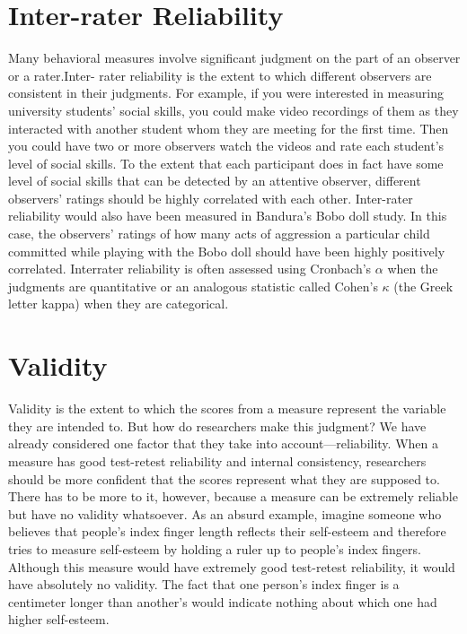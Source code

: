 \documentclass[]{book}
\theoremstyle{definition}
\theoremstyle{definition}
\theoremstyle{remark}
\begin{document}
\section{Inter-rater Reliability}\label{inter-rater-reliability}

Many behavioral measures involve significant judgment on the part of an
observer or a rater.Inter- rater reliability is the extent to which
different observers are consistent in their judgments. For example, if
you were interested in measuring university students' social skills, you
could make video recordings of them as they interacted with another
student whom they are meeting for the first time. Then you could have
two or more observers watch the videos and rate each student's level of
social skills. To the extent that each participant does in fact have
some level of social skills that can be detected by an attentive
observer, different observers' ratings should be highly correlated with
each other. Inter-rater reliability would also have been measured in
Bandura's Bobo doll study. In this case, the observers' ratings of how
many acts of aggression a particular child committed while playing with
the Bobo doll should have been highly positively correlated. Interrater
reliability is often assessed using Cronbach's \(\alpha\) when the
judgments are quantitative or an analogous statistic called Cohen's
\(\kappa\) (the Greek letter kappa) when they are categorical.

\section{Validity}\label{validity}

Validity is the extent to which the scores from a measure represent the
variable they are intended to. But how do researchers make this
judgment? We have already considered one factor that they take into
account---reliability. When a measure has good test-retest reliability
and internal consistency, researchers should be more confident that the
scores represent what they are supposed to. There has to be more to it,
however, because a measure can be extremely reliable but have no
validity whatsoever. As an absurd example, imagine someone who believes
that people's index finger length reflects their self-esteem and
therefore tries to measure self-esteem by holding a ruler up to people's
index fingers. Although this measure would have extremely good
test-retest reliability, it would have absolutely no validity. The fact
that one person's index finger is a centimeter longer than another's
would indicate nothing about which one had higher self-esteem.
\end{document}
